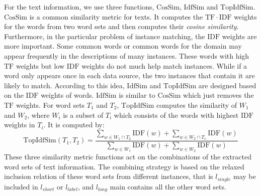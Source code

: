For the text information, we use three functions, $\mathrm{CosSim}$, $\mathrm{IdfSim}$ and $\mathrm{TopIdfSim}$. $\mathrm{CosSim}$ is a common similarity metric for texts. It computes the $\mathrm{TF}\cdot\mathrm{IDF}$\cite{cohen1998integration} weights for the words from two word sets and then computes their \textit{cosine similarity}. Furthermore, in the particular problem of instance matching, the $\mathrm{IDF}$ weights are more important. Some common words or common words for the domain may appear frequently in the descriptions of many instances. These words with high $\mathrm{TF}$ weights but low $\mathrm{IDF}$ weights do not much help match instances. While if a word only appears once in each data source, the two instances that contain it are likely to match. According to this idea, $\mathrm{IdfSim}$ and $\mathrm{TopIdfSim}$ are designed based on the $\mathrm{IDF}$ weights of words. $\mathrm{IdfSim}$ is similar to $\mathrm{CosSim}$ which just removes the $\mathrm{TF}$ weights. For word sets $T_1$ and $T_2$, $\mathrm{TopIdfSim}$ computes the similarity of $W_1$ and $W_2$, where $W_i$ is a subset of $T_i$ which consists of the words with highest $\mathrm{IDF}$ weights in $T_i$. It is computed by:
\begin{equation}
\mathrm{TopIdfSim}(T_1, T_2) = \frac{\sum_{w\in W_1\cap T_2}{}{\mathrm{IDF}(w)} + \sum_{w\in W_2\cap T_1}{}{\mathrm{IDF}(w)}}
                        {\sum_{w\in W_1}{}{\mathrm{IDF}(w)} + \sum_{w\in W_2}{}{\mathrm{IDF}(w)}}
\end{equation}
These three similarity metric functions act on the combinations of the extracted word sets of text information. The combining strategy is based on the relaxed inclusion relation of these word sets from different instances, that is $l_{single}$ may be included in $l_{short}$ or $l_{label}$, and $l_{long}$ main contains all the other word sets.

